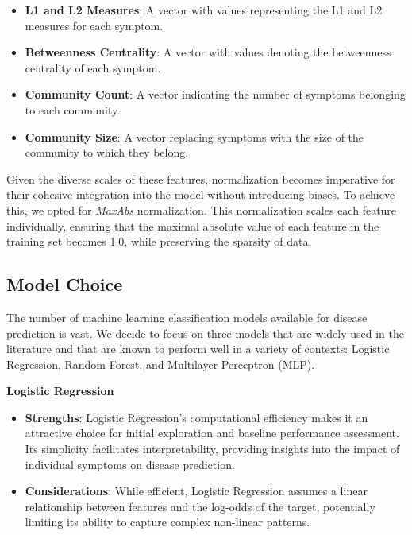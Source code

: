 \begin{itemize}
    \setlength\itemsep{0.4em} %
    \item \textbf{L1 and L2 Measures}: A vector with values representing the L1 and L2 measures for each symptom.
    \item \textbf{Betweenness Centrality}: A vector with values denoting the betweenness centrality of each symptom.
    \item \textbf{Community Count}: A vector indicating the number of symptoms belonging to each community.
    \item \textbf{Community Size}: A vector replacing symptoms with the size of the community to which they belong.
\end{itemize}
\vspace{0.4cm}

Given the diverse scales of these features, normalization becomes imperative for their cohesive integration into the model 
without introducing biases. To achieve this, we opted for \textit{MaxAbs} normalization. This normalization scales each feature 
individually, ensuring that the maximal absolute value of each feature in the training set becomes 1.0, while preserving the sparsity of data.



\subsection{Model Choice}
The number of machine learning classification models available for disease prediction is vast. We decide to focus on three models
that are widely used in the literature and that are known to perform well in a variety of contexts: Logistic Regression, Random Forest, and Multilayer Perceptron (MLP).

\textbf{Logistic Regression}\\
\begin{itemize}
    \item \textbf{Strengths}: Logistic Regression's computational efficiency makes it an attractive choice for initial exploration and 
    baseline performance assessment. Its simplicity facilitates interpretability, providing insights into the impact of individual symptoms on disease prediction.
    \item \textbf{Considerations}: While efficient, Logistic Regression assumes a linear relationship between features and the 
    log-odds of the target, potentially limiting its ability to capture complex non-linear patterns.
\end{itemize}
\vspace{0.4cm}


